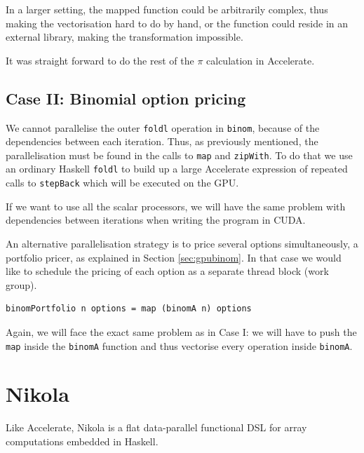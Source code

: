\documentclass[preprint]{sigplanconf}
\begin{document}
In a larger setting, the mapped function could be arbitrarily complex,
thus making the vectorisation hard to do by hand, or the function could
reside in an external library, making the transformation impossible.

It was straight forward to do the rest of the $\pi$ calculation in
Accelerate.

\subsection{Case II: Binomial option pricing}
We cannot parallelise the outer \verb|foldl| operation in
\verb|binom|, because of the dependencies between each
iteration. Thus, as previously mentioned, the parallelisation must be
found in the calls to \verb|map| and \verb|zipWith|. To do that we use
an ordinary Haskell \verb|foldl| to build up a large Accelerate
expression of repeated calls to \verb|stepBack| which will be executed
on the GPU.

If we want to use all the scalar processors, we will have the same
problem with dependencies between iterations when writing the program
in CUDA.

An alternative parallelisation strategy is to price several options
simultaneously, a portfolio pricer, as explained in Section
\ref{sec:gpubinom}. In that case we would like to schedule the pricing
of each option as a separate thread block (work group).

\begin{verbatim}
binomPortfolio n options = map (binomA n) options
\end{verbatim}

Again, we will face the exact same problem as in Case I: we will have
to push the \verb|map| inside the \verb|binomA| function and thus
vectorise every operation inside \verb|binomA|.


\section{Nikola}
Like Accelerate, Nikola is a flat data-parallel functional DSL for
array computations embedded in Haskell.
\end{document}
